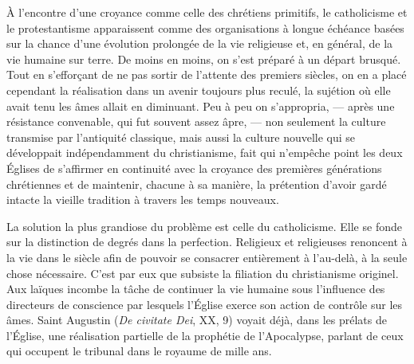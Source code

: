 \documentclass[12pt,a4paper]{article}
\newcommand{\opage}[1]{\marginnote{\footnotesize\textit{[#1]}}}
\begin{document}
À l'encontre d'une croyance comme celle des chrétiens primitifs,
le catholicisme et le protestantisme apparaissent comme des organisations
à longue échéance basées sur la chance d'une évolution
prolongée de la vie religieuse et, en général, de la vie humaine sur
terre. De moins en moins, on s'est préparé à un départ brusqué.
Tout en s'efforçant de ne pas sortir de l'attente des premiers siècles,
on en a placé cependant la réalisation dans un avenir toujours plus
reculé, la sujétion où elle avait tenu les âmes allait en diminuant.
Peu à peu on s'appropria, --- après une résistance convenable, qui
fut souvent assez âpre, --- non seulement la culture transmise par
l'antiquité classique, mais aussi la culture nouvelle qui se développait
indépendamment du christianisme, fait qui n'empêche point
les deux Églises de s'affirmer en continuité avec la croyance des
premières générations chrétiennes et de maintenir, chacune à sa
manière, la prétention d'avoir gardé intacte la vieille tradition à
travers les temps nouveaux.

La solution la plus grandiose du problème est celle du catholicisme.
Elle se fonde sur la distinction de degrés dans la perfection.
Religieux et religieuses renoncent à la vie dans le siècle afin de
pouvoir se consacrer entièrement à l'au-delà, à la seule chose nécessaire.
C'est par eux que subsiste la filiation du christianisme originel.
Aux laïques incombe la tâche de continuer la vie humaine sous
\opage{237} l'influence des directeurs de conscience par lesquels l'Église exerce
son action de contrôle sur les âmes. Saint Augustin (\emph{De civitate
Dei}, XX, 9) voyait déjà, dans les prélats de l'Église, une réalisation
partielle de la prophétie de l'Apocalypse, parlant de ceux qui
occupent le tribunal dans le royaume de mille ans.
\end{document}
